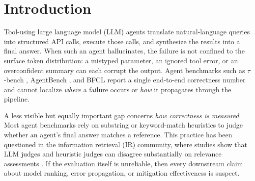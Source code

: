 \documentclass{ieeeaccess}
\begin{document}
\titlepgskip=-15pt
\maketitle

\section{Introduction}
\label{sec:intro}

Tool-using large language model (LLM) agents translate natural-language
queries into structured API calls, execute those calls, and synthesize
the results into a final answer.
When such an agent hallucinates, the failure is not confined to the
surface token distribution: a mistyped parameter, an ignored tool error,
or an overconfident summary can each corrupt the output.
Agent benchmarks such as $\tau$-bench \cite{yao2024tau},
AgentBench \cite{liu2024agentbench}, and BFCL \cite{yan2025bfcl}
report a single end-to-end correctness number and cannot localize
\emph{where} a failure occurs or \emph{how} it propagates through the
pipeline.

A less visible but equally important gap concerns \emph{how correctness
is measured}.
Most agent benchmarks rely on substring or keyword-match heuristics to
judge whether an agent's final answer matches a reference.
This practice has been questioned in the information retrieval (IR)
community, where studies show that LLM judges and heuristic judges can
disagree substantially on relevance assessments
\cite{soboroff2024dont,thomas2024searcher,alaofi2024fooled}.
If the evaluation itself is unreliable, then every downstream claim about
model ranking, error propagation, or mitigation effectiveness is suspect.
\end{document}
